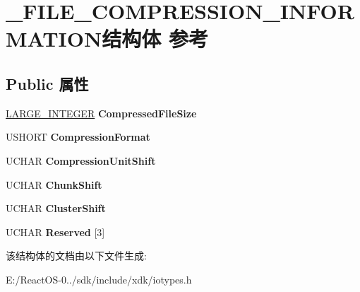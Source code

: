 \hypertarget{struct___f_i_l_e___c_o_m_p_r_e_s_s_i_o_n___i_n_f_o_r_m_a_t_i_o_n}{}\section{\+\_\+\+F\+I\+L\+E\+\_\+\+C\+O\+M\+P\+R\+E\+S\+S\+I\+O\+N\+\_\+\+I\+N\+F\+O\+R\+M\+A\+T\+I\+O\+N结构体 参考}
\label{struct___f_i_l_e___c_o_m_p_r_e_s_s_i_o_n___i_n_f_o_r_m_a_t_i_o_n}
\subsection*{Public 属性}
\begin{DoxyCompactItemize}
\item 
\mbox{\label{struct___f_i_l_e___c_o_m_p_r_e_s_s_i_o_n___i_n_f_o_r_m_a_t_i_o_n_aa208c2681daa0fee465773eb4861d59a}} 
\hyperlink{union___l_a_r_g_e___i_n_t_e_g_e_r}{L\+A\+R\+G\+E\+\_\+\+I\+N\+T\+E\+G\+ER} {\bfseries Compressed\+File\+Size}
\item 
\mbox{\label{struct___f_i_l_e___c_o_m_p_r_e_s_s_i_o_n___i_n_f_o_r_m_a_t_i_o_n_a7c6ed3b0dfbfbca8fda06b06006556cf}} 
U\+S\+H\+O\+RT {\bfseries Compression\+Format}
\item 
\mbox{\label{struct___f_i_l_e___c_o_m_p_r_e_s_s_i_o_n___i_n_f_o_r_m_a_t_i_o_n_a28057b5e7330620b11808f9125405cf1}} 
U\+C\+H\+AR {\bfseries Compression\+Unit\+Shift}
\item 
\mbox{\label{struct___f_i_l_e___c_o_m_p_r_e_s_s_i_o_n___i_n_f_o_r_m_a_t_i_o_n_a6f4dd12abdec52ad213debd40b8ad07c}} 
U\+C\+H\+AR {\bfseries Chunk\+Shift}
\item 
\mbox{\label{struct___f_i_l_e___c_o_m_p_r_e_s_s_i_o_n___i_n_f_o_r_m_a_t_i_o_n_af318f2c2f70595c9d2036897d368993a}} 
U\+C\+H\+AR {\bfseries Cluster\+Shift}
\item 
\mbox{\label{struct___f_i_l_e___c_o_m_p_r_e_s_s_i_o_n___i_n_f_o_r_m_a_t_i_o_n_ae19141a501119c0f5eafe2b347d74d0e}} 
U\+C\+H\+AR {\bfseries Reserved} \mbox{[}3\mbox{]}
\end{DoxyCompactItemize}


该结构体的文档由以下文件生成\+:\begin{DoxyCompactItemize}
\item 
E\+:/\+React\+O\+S-\/0../sdk/include/xdk/iotypes.\+h\end{DoxyCompactItemize}
